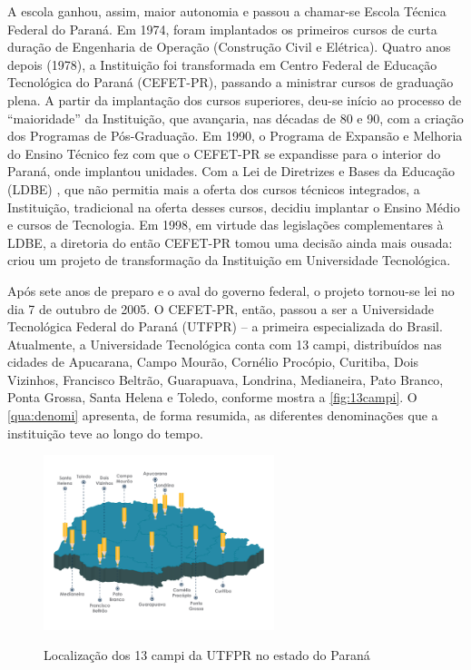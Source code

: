 A escola ganhou, assim, maior autonomia e passou a chamar-se Escola Técnica Federal do Paraná. Em 1974, foram implantados os primeiros cursos de curta duração de Engenharia de Operação (Construção Civil e Elétrica). Quatro anos depois (1978), a Instituição foi transformada em Centro Federal de Educação Tecnológica do Paraná (CEFET-PR), passando a ministrar cursos de graduação plena. A partir da implantação dos cursos superiores, deu-se início ao processo de “maioridade” da Instituição, que avançaria, nas décadas de 80 e 90, com a criação dos Programas de Pós-Graduação. Em 1990, o Programa de Expansão e Melhoria do Ensino Técnico fez com que o CEFET-PR se expandisse para o interior do Paraná, onde implantou unidades. Com a Lei de Diretrizes e Bases da Educação (LDBE) \cite{Lei:9394:1996}, que não permitia mais a oferta dos cursos técnicos integrados, a Instituição, tradicional na oferta desses cursos, decidiu implantar o Ensino Médio e cursos de Tecnologia. Em 1998, em virtude das legislações complementares à LDBE, a diretoria do então CEFET-PR tomou uma decisão ainda mais ousada: criou um projeto de transformação da Instituição em Universidade Tecnológica.


Após sete anos de preparo e o aval do governo federal, o projeto tornou-se lei no dia 7 de outubro de 2005. O CEFET-PR, então, passou a ser a Universidade Tecnológica Federal do Paraná (UTFPR) \cite{Lei:11.184:2005} – a primeira especializada do Brasil. Atualmente, a Universidade Tecnológica conta com 13 campi, distribuídos nas cidades de Apucarana, Campo Mourão, Cornélio Procópio, Curitiba, Dois Vizinhos, Francisco Beltrão, Guarapuava, Londrina,  Medianeira, Pato Branco, Ponta Grossa, Santa Helena e Toledo, conforme mostra a \autoref{fig:13campi}. O \autoref{qua:denomi} apresenta, de forma resumida, as diferentes denominações que a instituição teve ao longo do tempo.


    \begin{figure}[!htb]
        \centering
        \caption[Localização dos 13 campi da UTFPR]{Localização dos 13 campi da UTFPR no estado do Paraná}
        \includegraphics[width=0.6\textwidth]{Caps/Figs/campus_utfpr.png}
        \fonte{\utf}
        \label{fig:13campi}
    \end{figure}
    
